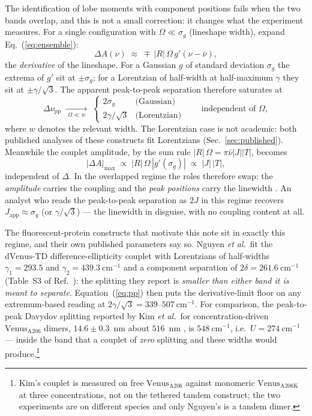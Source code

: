 \documentclass[11pt,a4paper]{article}
\begin{document}
The identification of lobe moments with component positions fails when the two
bands overlap, and this is not a small correction: it changes what the
experiment measures. For a single configuration with $\Omega\ll\sigma_g$
(lineshape width), expand Eq.~(\ref{eq:ensemble}):
\begin{equation}
\Delta A(\nu)\;\approx\;\mp\,|R|\,\Omega\,g'(\nu-\bar\nu),
\label{eq:derivative}
\end{equation}
the \emph{derivative} of the lineshape. For a Gaussian $g$ of standard
deviation $\sigma_g$ the extrema of $g'$ sit at $\pm\sigma_g$; for a Lorentzian
of half-width at half-maximum $\gamma$ they sit at $\pm\gamma/\sqrt{3}$. The
apparent peak-to-peak separation therefore saturates at
\begin{equation}
\Delta\nu_{\mathrm{pp}}\;\xrightarrow[\;\Omega\ll w\;]{}\;
\begin{cases}
2\sigma_g & \text{(Gaussian)}\\[2pt]
2\gamma/\sqrt{3} & \text{(Lorentzian)}
\end{cases}
\qquad\text{independent of }\Omega ,
\label{eq:pp}
\end{equation}
where $w$ denotes the relevant width. The Lorentzian case is not academic: both
published analyses of these constructs fit Lorentzians
(Sec.~\ref{sec:published}). Meanwhile the couplet amplitude, by the sum rule
$|R|\,\Omega=\pi\bar\nu|J||T|$, becomes
\begin{equation}
|\Delta A|_{\max}\;\propto\;|R|\,\Omega\,|g'(\sigma_g)|
\;\propto\;|J|\,|T|,
\end{equation}
independent of $\Delta$. In the overlapped regime the roles therefore swap:
the \emph{amplitude} carries the coupling and the \emph{peak positions} carry
the linewidth \cite{rodger1997,pescitelli2016}. An analyst who reads the
peak-to-peak separation as $2J$ in this regime recovers
$J_{\mathrm{app}}\approx\sigma_g$ (or $\gamma/\sqrt3$) --- the linewidth in
disguise, with no coupling content at all.

The fluorescent-protein constructs that motivate this note sit in exactly this
regime, and their own published parameters say so. Nguyen \emph{et al.}\ fit
the $\mathrm{dVenus\mbox{-}TD}$ difference-ellipticity couplet with Lorentzians
of half-widths $\gamma_{1}=293.5$ and $\gamma_{2}=439.3~\mathrm{cm^{-1}}$ and a
component separation of $2\delta=261.6~\mathrm{cm^{-1}}$ (Table~S3 of
Ref.~\cite{nguyen2025}): the splitting they report is \emph{smaller than either
band it is meant to separate}. Equation~(\ref{eq:pp}) then puts the
derivative-limit floor on any extremum-based reading at
$2\gamma/\sqrt{3} = 339$--$507~\mathrm{cm^{-1}}$. For comparison, the
peak-to-peak Davydov splitting reported by Kim \emph{et al.}\ for
concentration-driven $\mathrm{Venus_{A206}}$ dimers, $14.6\pm0.3$~nm about
$516$~nm \cite{kim2019}, is $548~\mathrm{cm^{-1}}$, i.e.\ $U=274~\mathrm{cm^{-1}}$
--- inside the band that a couplet of \emph{zero} splitting and these widths
would produce.\footnote{Kim's couplet is measured on free
$\mathrm{Venus_{A206}}$ against monomeric $\mathrm{Venus_{A206K}}$ at three
concentrations, not on the tethered tandem construct; the two experiments are
on different species and only Nguyen's is a tandem dimer.}
\end{document}
